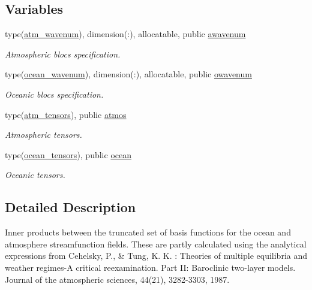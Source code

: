 \subsection*{Variables}
\begin{DoxyCompactItemize}
\item 
type(\hyperlink{structinprod__analytic_1_1atm__wavenum}{atm\+\_\+wavenum}), dimension(\+:), allocatable, public \hyperlink{namespaceinprod__analytic_aa6b6ebedac44495720ffe649bc937a56}{awavenum}
\begin{DoxyCompactList}\small\item\em Atmospheric blocs specification. \end{DoxyCompactList}\item 
type(\hyperlink{structinprod__analytic_1_1ocean__wavenum}{ocean\+\_\+wavenum}), dimension(\+:), allocatable, public \hyperlink{namespaceinprod__analytic_a7273713c6b1a079e1c653e8b8d2fe089}{owavenum}
\begin{DoxyCompactList}\small\item\em Oceanic blocs specification. \end{DoxyCompactList}\item 
type(\hyperlink{structinprod__analytic_1_1atm__tensors}{atm\+\_\+tensors}), public \hyperlink{namespaceinprod__analytic_a6f4fe9aa292d78b871e5498e411d1297}{atmos}
\begin{DoxyCompactList}\small\item\em Atmospheric tensors. \end{DoxyCompactList}\item 
type(\hyperlink{structinprod__analytic_1_1ocean__tensors}{ocean\+\_\+tensors}), public \hyperlink{namespaceinprod__analytic_ac691a1258fb0a341e2ba5b4811be1c0b}{ocean}
\begin{DoxyCompactList}\small\item\em Oceanic tensors. \end{DoxyCompactList}\end{DoxyCompactItemize}


\subsection{Detailed Description}
Inner products between the truncated set of basis functions for the ocean and atmosphere streamfunction fields. These are partly calculated using the analytical expressions from Cehelsky, P., \& Tung, K. K. \+: Theories of multiple equilibria and weather regimes-\/A critical reexamination. Part II\+: Baroclinic two-\/layer models. Journal of the atmospheric sciences, 44(21), 3282-\/3303, 1987. 

